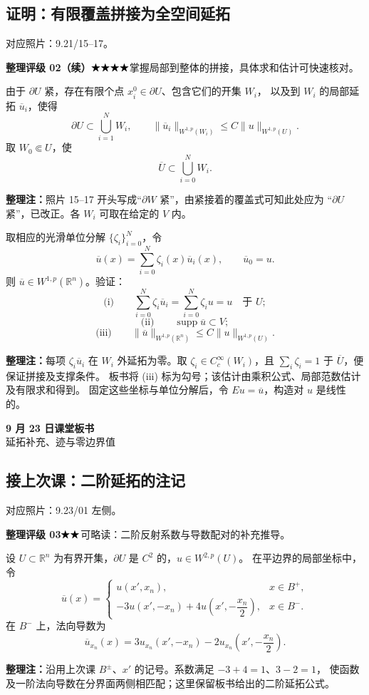\documentclass[UTF8,a4paper,11pt,fontset=fandol]{ctexart}
\newcommand{\R}{\mathbb R}
\newcommand{\ednote}[1]{\par{\small\color{notegray}\textbf{整理注：}#1}\par}
\newcommand{\source}[1]{{\small\color{notegray}对应照片：#1。}\par}
\newcommand{\proofstars}[1]{\ensuremath{%
\ifnum#1>0\relax\bigstar\fi
\ifnum#1>1\relax\bigstar\fi
\ifnum#1>2\relax\bigstar\fi
\ifnum#1>3\relax\bigstar\fi
\ifnum#1>4\relax\bigstar\fi}}
\newcommand{\proofrating}[3]{\par{\small\color{proofblue}%
\textbf{整理评级 #1}\enspace\proofstars{#2}\quad #3\par}}
\begin{document}
\subsection*{证明：有限覆盖拼接为全空间延拓}
\source{9.21/15--17}
\proofrating{02（续）}{4}{掌握局部到整体的拼接，具体求和估计可快速核对。}
由于 $\partial U$ 紧，存在有限个点 $x_i^0\in\partial U$、包含它们的开集 $W_i$，
以及到 $W_i$ 的局部延拓 $\overline u_i$，使得
\[
\partial U\subset\bigcup_{i=1}^N W_i,\qquad
\|\overline u_i\|_{W^{1,p}(W_i)}\leq C\|u\|_{W^{1,p}(U)}.
\]
取 $W_0\Subset U$，使
\[
\overline U\subset\bigcup_{i=0}^N W_i.
\]
\ednote{照片 15--17 开头写成“$\partial W$ 紧”，由紧接着的覆盖式可知此处应为
“$\partial U$ 紧”，已改正。各 $W_i$ 可取在给定的 $V$ 内。}
取相应的光滑单位分解 $\{\zeta_i\}_{i=0}^N$，令
\[
\overline u(x)=\sum_{i=0}^N\zeta_i(x)\overline u_i(x),\qquad
\overline u_0=u.
\]
则 $\overline u\in W^{1,p}(\R^n)$。验证：
\[
\text{(i)}\qquad
\sum_{i=0}^N\zeta_i\overline u_i
=\sum_{i=0}^N\zeta_i u=u\quad\text{于 }U;
\]
\[
\text{(ii)}\qquad\operatorname{supp}\overline u\subset V;
\]
\[
\text{(iii)}\qquad\|\overline u\|_{W^{1,p}(\R^n)}\leq C\|u\|_{W^{1,p}(U)}.
\]
\ednote{每项 $\zeta_i\overline u_i$ 在 $W_i$ 外延拓为零。取
$\zeta_i\in C_c^\infty(W_i)$，且 $\sum_i\zeta_i=1$ 于 $\overline U$，便保证拼接及支撑条件。
板书将 (iii) 标为勾号；该估计由乘积公式、局部范数估计及有限求和得到。
固定这些坐标与单位分解后，令 $Eu=\overline u$，构造对 $u$ 是线性的。}

\clearpage
{}
\begin{center}
{\LARGE\bfseries 9 月 23 日课堂板书}\\[4pt]
{延拓补充、迹与零边界值}
\end{center}
\subsection*{接上次课：二阶延拓的注记}
\source{9.23/01 左侧}
\proofrating{03}{2}{可略读：二阶反射系数与导数配对的补充推导。}
设 $U\subset\R^n$ 为有界开集，$\partial U$ 是 $C^2$ 的，$u\in W^{2,p}(U)$。
在平边界的局部坐标中，令
\[
\overline u(x)=\begin{cases}
u(x',x_n),&x\in B^+,\\
-3u(x',-x_n)+4u\left(x',-\dfrac{x_n}{2}\right),&x\in B^-.
\end{cases}
\]
在 $B^-$ 上，法向导数为
\[
\overline u_{x_n}(x)
=3u_{x_n}(x',-x_n)-2u_{x_n}\left(x',-\frac{x_n}{2}\right).
\]
\ednote{沿用上次课 $B^\pm$、$x'$ 的记号。系数满足 $-3+4=1$、$3-2=1$，
使函数及一阶法向导数在分界面两侧相匹配；这里保留板书给出的二阶延拓公式。}
\end{document}
